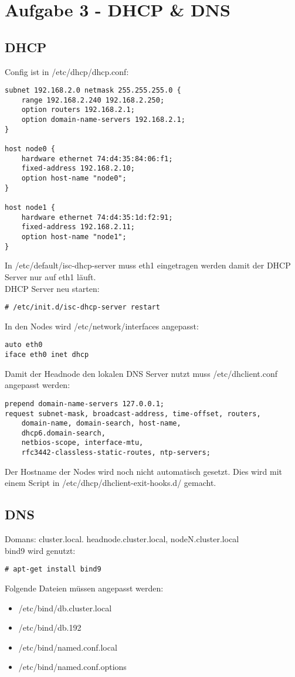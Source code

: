 \chapter{Aufgabe 3 - DHCP \& DNS}
\section{DHCP}
Config ist in /etc/dhcp/dhcp.conf:
\begin{lstlisting}[style=Bash]
subnet 192.168.2.0 netmask 255.255.255.0 {
	range 192.168.2.240 192.168.2.250;
	option routers 192.168.2.1;
	option domain-name-servers 192.168.2.1;
}

host node0 {
	hardware ethernet 74:d4:35:84:06:f1;
	fixed-address 192.168.2.10;
	option host-name "node0";
}

host node1 {
	hardware ethernet 74:d4:35:1d:f2:91;
	fixed-address 192.168.2.11;
	option host-name "node1";
}
\end{lstlisting}
In /etc/default/isc-dhcp-server muss eth1 eingetragen werden damit der DHCP Server nur auf eth1 läuft.\\
DHCP Server neu starten:
\begin{lstlisting}[style=Bash]
# /etc/init.d/isc-dhcp-server restart
\end{lstlisting}
In den Nodes wird /etc/network/interfaces angepasst:
\begin{lstlisting}[style=Bash]
auto eth0
iface eth0 inet dhcp
\end{lstlisting}
Damit der Headnode den lokalen DNS Server nutzt muss /etc/dhclient.conf angepasst werden:
\begin{lstlisting}[style=Bash]
prepend domain-name-servers 127.0.0.1;
request subnet-mask, broadcast-address, time-offset, routers,
	domain-name, domain-search, host-name,
	dhcp6.domain-search,
	netbios-scope, interface-mtu,
	rfc3442-classless-static-routes, ntp-servers;
\end{lstlisting}
Der Hostname der Nodes wird noch nicht automatisch gesetzt. Dies wird mit einem Script in /etc/dhcp/dhclient-exit-hooks.d/ gemacht.
\section{DNS}
Domans: cluster.local. headnode.cluster.local, nodeN.cluster.local\\
bind9 wird genutzt:
\begin{lstlisting}[style=Bash]
# apt-get install bind9
\end{lstlisting}
Folgende Dateien müssen angepasst werden:
\begin {itemize}
\item /etc/bind/db.cluster.local
\item /etc/bind/db.192
\item /etc/bind/named.conf.local
\item /etc/bind/named.conf.options
\end{itemize}
